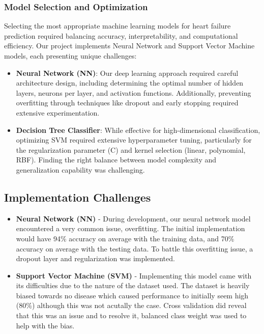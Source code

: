\documentclass[11pt,a4paper]{article}
\newcommand{\greencheck}{\textcolor{green}{\ding{52}}}
\begin{document}
\subsubsection{Model Selection and Optimization}
\vspace{-0.25cm}
Selecting the most appropriate machine learning models for heart failure prediction required balancing accuracy, interpretability, and computational efficiency. Our project implements Neural Network and Support Vector Machine models, each presenting unique challenges:

\begin{itemize}
    \vspace{-0.25cm}
    \item \textbf{\greencheck \space Neural Network (NN)}: Our deep learning approach required careful architecture design, including determining the optimal number of hidden layers, neurons per layer, and activation functions. Additionally, preventing overfitting through techniques like dropout and early stopping required extensive experimentation.

    \item \textbf{\greencheck \space Decision Tree Classifier}: While effective for high-dimensional classification, optimizing SVM required extensive hyperparameter tuning, particularly for the regularization parameter (C) and kernel selection (linear, polynomial, RBF). Finding the right balance between model complexity and generalization capability was challenging.
\end{itemize}

\subsection{Implementation Challenges}
\begin{itemize}
    \item \textbf{Neural Network (NN)} - During development, our neural network model encountered a very common issue, overfitting. The initial implementation would have 94\% accuracy on average with the training data, and 70\% accuracy on average with the testing data. To battle this overfitting issue, a dropout layer and regularization was implemented.
    \item \textbf{Support Vector Machine (SVM)} - Implementing this model came with its difficulties due to the nature of the dataset used. The dataset is heavily biased towards no disease which caused performance to initially seem high (80\%) although this was not acutally the case. Cross validation did reveal that this was an issue and to resolve it,  balanced class weight was used to help with the bias.
\end{itemize}
\end{document}
